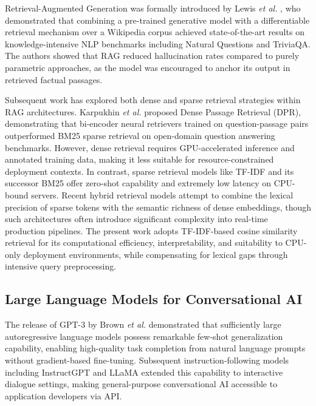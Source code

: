 \documentclass[conference]{IEEEtran}
\begin{document}
Retrieval-Augmented Generation was formally introduced by Lewis \textit{et al.} \cite{lewis2020rag}, who demonstrated that combining a pre-trained generative model with a differentiable retrieval mechanism over a Wikipedia corpus achieved state-of-the-art results on knowledge-intensive NLP benchmarks including Natural Questions and TriviaQA. The authors showed that RAG reduced hallucination rates compared to purely parametric approaches, as the model was encouraged to anchor its output in retrieved factual passages.

Subsequent work has explored both dense and sparse retrieval strategies within RAG architectures. Karpukhin \textit{et al.} \cite{karpukhin2020dpr} proposed Dense Passage Retrieval (DPR), demonstrating that bi-encoder neural retrievers trained on question-passage pairs outperformed BM25 sparse retrieval on open-domain question answering benchmarks. However, dense retrieval requires GPU-accelerated inference and annotated training data, making it less suitable for resource-constrained deployment contexts. In contrast, sparse retrieval models like TF-IDF and its successor BM25 \cite{robertson2009bm25} offer zero-shot capability and extremely low latency on CPU-bound servers. Recent hybrid retrieval models \cite{izacard2021leveraging} attempt to combine the lexical precision of sparse tokens with the semantic richness of dense embeddings, though such architectures often introduce significant complexity into real-time production pipelines. The present work adopts TF-IDF-based cosine similarity retrieval for its computational efficiency, interpretability, and suitability to CPU-only deployment environments, while compensating for lexical gaps through intensive query preprocessing.

\subsection{Large Language Models for Conversational AI}

The release of GPT-3 by Brown \textit{et al.} \cite{brown2020gpt3} demonstrated that sufficiently large autoregressive language models possess remarkable few-shot generalization capability, enabling high-quality task completion from natural language prompts without gradient-based fine-tuning. Subsequent instruction-following models including InstructGPT \cite{ouyang2022instructgpt} and LLaMA \cite{touvron2023llama} extended this capability to interactive dialogue settings, making general-purpose conversational AI accessible to application developers via API.
\end{document}
